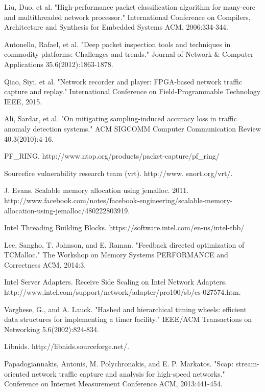 \documentclass[conference]{IEEEtran}
\begin{document}
\begin{thebibliography}{1}

  Liu, Duo, et al. "High-performance packet classification algorithm for many-core and multithreaded network processor." International Conference on Compilers, Architecture and Synthesis for Embedded Systems ACM, 2006:334-344.
  
  Antonello, Rafael, et al. "Deep packet inspection tools and techniques in commodity platforms: Challenges and trends." Journal of Network \& Computer Applications 35.6(2012):1863-1878.
  
  Qiao, Siyi, et al. "Network recorder and player: FPGA-based network traffic capture and replay." International Conference on Field-Programmable Technology IEEE, 2015.
  
  Ali, Sardar, et al. "On mitigating sampling-induced accuracy loss in traffic anomaly detection systems." ACM SIGCOMM Computer Communication Review 40.3(2010):4-16.
  
  PF\_RING. http://www.ntop.org/products/packet-capture/pf\_ring/

  Sourcefire vulnerability research team (vrt). http://www.
snort.org/vrt/.

  J. Evans. Scalable memory allocation using jemalloc. 2011. http://www.facebook.com/notes/facebook-engineering/scalable-memory-allocation-using-jemalloc/480222803919.
  
  Intel Threading Building Blocks. https://software.intel.com/en-us/intel-tbb/
  
  Lee, Sangho, T. Johnson, and E. Raman. "Feedback directed optimization of TCMalloc." The Workshop on Memory Systems PERFORMANCE and Correctness ACM, 2014:3.
  
  Intel Server Adapters. Receive Side Scaling on Intel Network Adapters. http://www.intel.com/support/network/adapter/pro100/sb/cs-027574.htm.
  
  Varghese, G., and A. Lauck. "Hashed and hierarchical timing wheels: efficient data structures for implementing a timer facility." IEEE/ACM Transactions on Networking 5.6(2002):824-834.
  
  Libnids. http://libnids.sourceforge.net/.
  
  Papadogiannakis, Antonis, M. Polychronakis, and E. P. Markatos. "Scap: stream-oriented network traffic capture and analysis for high-speed networks." Conference on Internet Measurement Conference ACM, 2013:441-454.
  

\end{thebibliography}
\end{document}

